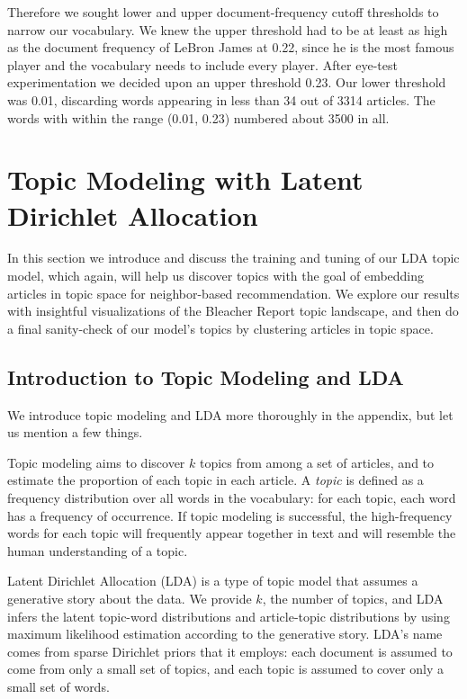 \documentclass[11pt]{article}
\begin{document}
Therefore we sought lower and upper document-frequency cutoff thresholds to narrow our vocabulary.  We knew the upper threshold had to be at least as high as the document frequency of LeBron James at 0.22, since he is the most famous player and the vocabulary needs to include every player. After eye-test experimentation we decided upon an upper threshold 0.23. Our lower threshold was 0.01, discarding words appearing in less than 34 out of 3314 articles.  The words with within the range (0.01, 0.23) numbered about 3500 in all.

\section{Topic Modeling with Latent Dirichlet Allocation}
In this section we introduce and discuss the training and tuning of our LDA topic model, which again, will help us discover topics with the goal of embedding articles in topic space for neighbor-based recommendation. We explore our results with insightful visualizations of the Bleacher Report topic landscape, and then do a final sanity-check of our model's topics by clustering articles in topic space.

\subsection{Introduction to Topic Modeling and LDA}
We introduce topic modeling and LDA more thoroughly in the appendix, but let us mention a few things.

Topic modeling aims to discover $k$ topics from among a set of articles, and to estimate the proportion of each topic in each article.  A \textit{topic} is defined as a frequency distribution over all words in the vocabulary: for each topic, each word has a frequency of occurrence.  If topic modeling is successful, the high-frequency words for each topic will frequently appear together in text and will resemble the human understanding of a topic. 

Latent Dirichlet Allocation (LDA) is a type of topic model that assumes a generative story about the data.  We provide $k$, the number of topics, and LDA infers the latent topic-word distributions and article-topic distributions by using maximum likelihood estimation according to the generative story.  LDA's name comes from sparse Dirichlet priors that it employs: each document is assumed to come from only a small set of topics, and each topic is assumed to cover only a small set of words.
\end{document}
